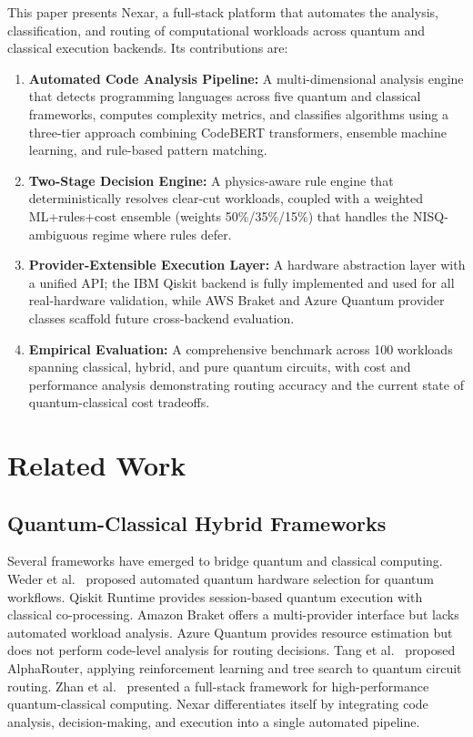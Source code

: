 \documentclass[10pt,conference]{IEEEtran}
\begin{document}
This paper presents Nexar, a full-stack platform that automates the analysis, classification, and routing of computational workloads across quantum and classical execution backends. Its contributions are:

\begin{enumerate}
    \item \textbf{Automated Code Analysis Pipeline:} A multi-dimensional analysis engine that detects programming languages across five quantum and classical frameworks, computes complexity metrics, and classifies algorithms using a three-tier approach combining CodeBERT transformers, ensemble machine learning, and rule-based pattern matching.
    \item \textbf{Two-Stage Decision Engine:} A physics-aware rule engine that deterministically resolves clear-cut workloads, coupled with a weighted ML+rules+cost ensemble (weights 50\%/35\%/15\%) that handles the NISQ-ambiguous regime where rules defer.
    \item \textbf{Provider-Extensible Execution Layer:} A hardware abstraction layer with a unified API; the IBM Qiskit backend is fully implemented and used for all real-hardware validation, while AWS Braket and Azure Quantum provider classes scaffold future cross-backend evaluation.
    \item \textbf{Empirical Evaluation:} A comprehensive benchmark across 100 workloads spanning classical, hybrid, and pure quantum circuits, with cost and performance analysis demonstrating routing accuracy and the current state of quantum-classical cost tradeoffs.
\end{enumerate}

\section{Related Work}

\subsection{Quantum-Classical Hybrid Frameworks}

Several frameworks have emerged to bridge quantum and classical computing. Weder et al.\ \cite{weder2021} proposed automated quantum hardware selection for quantum workflows. Qiskit Runtime \cite{ibm2023} provides session-based quantum execution with classical co-processing. Amazon Braket \cite{aws2023} offers a multi-provider interface but lacks automated workload analysis. Azure Quantum \cite{microsoft2023} provides resource estimation but does not perform code-level analysis for routing decisions. Tang et al.\ \cite{tang2024} proposed AlphaRouter, applying reinforcement learning and tree search to quantum circuit routing. Zhan et al.\ \cite{zhan2025} presented a full-stack framework for high-performance quantum-classical computing. Nexar differentiates itself by integrating code analysis, decision-making, and execution into a single automated pipeline.
\end{document}
